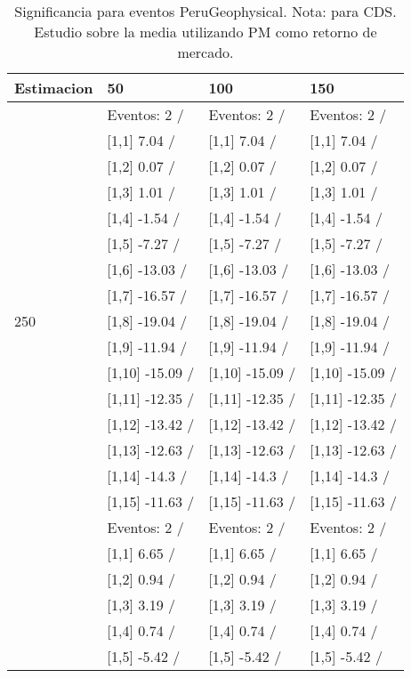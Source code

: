 \begin{table}

\caption{Significancia para eventos PeruGeophysical. Nota: para CDS. Estudio sobre la media utilizando PM como retorno de mercado.}
\centering
\begin{tabular}[t]{llll}
\toprule
Estimacion & 50 & 100 & 150\\
\midrule
 & Eventos:  2 / & Eventos:  2 / & Eventos:  2 /\\
 & {}[1,1] 7.04  / & {}[1,1] 7.04  / & {}[1,1] 7.04  /\\
 & {}[1,2] 0.07  / & {}[1,2] 0.07  / & {}[1,2] 0.07  /\\
 & {}[1,3] 1.01  / & {}[1,3] 1.01  / & {}[1,3] 1.01  /\\
 & {}[1,4] -1.54  / & {}[1,4] -1.54  / & {}[1,4] -1.54  /\\
\addlinespace
 & {}[1,5] -7.27  / & {}[1,5] -7.27  / & {}[1,5] -7.27  /\\
 & {}[1,6] -13.03  / & {}[1,6] -13.03  / & {}[1,6] -13.03  /\\
 & {}[1,7] -16.57  / & {}[1,7] -16.57  / & {}[1,7] -16.57  /\\
250 & {}[1,8] -19.04  / & {}[1,8] -19.04  / & {}[1,8] -19.04  /\\
 & {}[1,9] -11.94  / & {}[1,9] -11.94  / & {}[1,9] -11.94  /\\
\addlinespace
 & {}[1,10] -15.09  / & {}[1,10] -15.09  / & {}[1,10] -15.09  /\\
 & {}[1,11] -12.35  / & {}[1,11] -12.35  / & {}[1,11] -12.35  /\\
 & {}[1,12] -13.42  / & {}[1,12] -13.42  / & {}[1,12] -13.42  /\\
 & {}[1,13] -12.63  / & {}[1,13] -12.63  / & {}[1,13] -12.63  /\\
 & {}[1,14] -14.3  / & {}[1,14] -14.3  / & {}[1,14] -14.3  /\\
\addlinespace
 & {}[1,15] -11.63  / & {}[1,15] -11.63  / & {}[1,15] -11.63  /\\
 & Eventos:  2 / & Eventos:  2 / & Eventos:  2 /\\
 & {}[1,1] 6.65  / & {}[1,1] 6.65  / & {}[1,1] 6.65  /\\
 & {}[1,2] 0.94  / & {}[1,2] 0.94  / & {}[1,2] 0.94  /\\
 & {}[1,3] 3.19  / & {}[1,3] 3.19  / & {}[1,3] 3.19  /\\
\addlinespace
 & {}[1,4] 0.74  / & {}[1,4] 0.74  / & {}[1,4] 0.74  /\\
 & {}[1,5] -5.42  / & {}[1,5] -5.42  / & {}[1,5] -5.42  /\\

\end{tabular}
\end{table}
